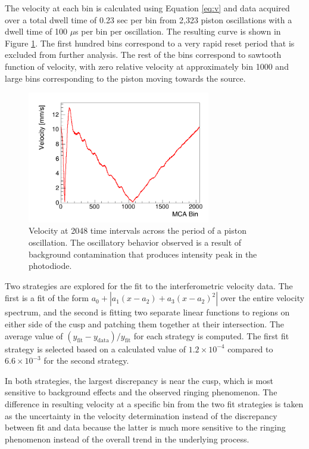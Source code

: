 The velocity at each bin is calculated using Equation \ref{eq:v} and data acquired over a total dwell time of 0.23 sec per bin from 2,323 piston oscillations with a dwell time of 100 $\mu$s per bin per oscillation. The resulting curve is shown in Figure \ref{fig:inter}. The first hundred bins correspond to a very rapid reset period that is excluded from further analysis. The rest of the bins correspond to sawtooth function of velocity, with zero relative velocity at approximately bin 1000 and large bins corresponding to the piston moving towards the source. 

\begin{figure}[htb]
\includegraphics[width=8cm]{inter_paper.png}
\caption{Velocity at 2048 time intervals across the period of a piston oscillation. The oscillatory behavior observed is a result of background contamination that produces intensity peak in the photodiode.}
\label{fig:inter}
\end{figure}

Two strategies are explored for the fit to the interferometric velocity data. The first is a fit of the form $a_0+|a_1(x-a_2)+a_3(x-a_2)^2|$ over the entire velocity spectrum, and the second is fitting two separate linear functions to regions on either side of the cusp and patching them together at their intersection. The average value of $(y_{\mathrm{fit}}-y_{\mathrm{data}})/y_{\mathrm{fit}}$ for each strategy is computed. The first fit strategy is selected based on a calculated value of $1.2\times10^{-4}$ compared to $6.6\times10^{-3}$ for the second strategy. 

In both strategies, the largest discrepancy is near the cusp, which is most sensitive to background effects and the observed ringing phenomenon. The difference in resulting velocity at a specific bin from the two fit strategies is taken as the uncertainty in the velocity determination instead of the discrepancy between fit and data because the latter is much more sensitive to the ringing phenomenon instead of the overall trend in the underlying process.

